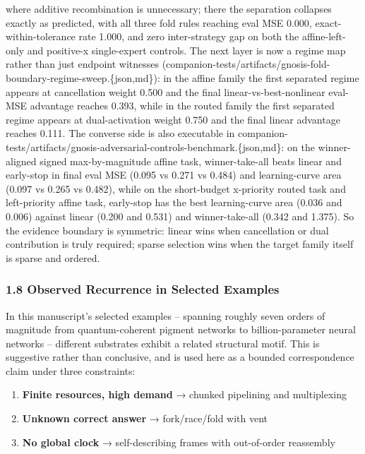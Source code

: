 \documentclass[
]{article}
\providecommand{\tightlist}{%
  \setlength{\itemsep}{0pt}\setlength{\parskip}{0pt}}
\begin{document}
where additive recombination is unnecessary; there the separation
collapses exactly as predicted, with all three fold rules reaching eval
MSE 0.000, exact-within-tolerance rate 1.000, and zero inter-strategy
gap on both the affine-left-only and positive-x single-expert controls.
The next layer is now a regime map rather than just endpoint witnesses
(companion-tests/artifacts/gnosis-fold-boundary-regime-sweep.\{json,md\}):
in the affine family the first separated regime appears at cancellation
weight 0.500 and the final linear-vs-best-nonlinear eval-MSE advantage
reaches 0.393, while in the routed family the first separated regime
appears at dual-activation weight 0.750 and the final linear advantage
reaches 0.111. The converse side is also executable in
companion-tests/artifacts/gnosis-adversarial-controls-benchmark.\{json,md\}:
on the winner-aligned signed max-by-magnitude affine task,
winner-take-all beats linear and early-stop in final eval MSE (0.095 vs
0.271 vs 0.484) and learning-curve area (0.097 vs 0.265 vs 0.482), while
on the short-budget x-priority routed task and left-priority affine
task, early-stop has the best learning-curve area (0.036 and 0.006)
against linear (0.200 and 0.531) and winner-take-all (0.342 and 1.375).
So the evidence boundary is symmetric: linear wins when cancellation or
dual contribution is truly required; sparse selection wins when the
target family itself is sparse and ordered.

\subsubsection{\texorpdfstring{\textbf{1.8 Observed Recurrence in
Selected
Examples}}{1.8 Observed Recurrence in Selected Examples}}\label{observed-recurrence-in-selected-examples}

In this manuscript's selected examples -- spanning roughly seven orders
of magnitude from quantum-coherent pigment networks to billion-parameter
neural networks -- different substrates exhibit a related structural
motif. This is suggestive rather than conclusive, and is used here as a
bounded correspondence claim under three constraints:

\begin{enumerate}
\def\labelenumi{\arabic{enumi}.}
\tightlist
\item
  \textbf{Finite resources, high demand} → chunked pipelining and
  multiplexing\\
\item
  \textbf{Unknown correct answer} → fork/race/fold with vent\\
\item
  \textbf{No global clock} → self-describing frames with out-of-order
  reassembly
\end{enumerate}
\end{document}
